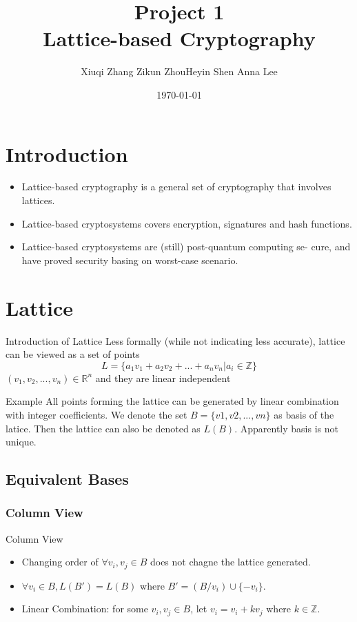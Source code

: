 \documentclass{beamer}
\author{Xiuqi Zhang \quad Zikun Zhou\quad Heyin Shen \quad Anna Lee}
\title{Project 1 \\Lattice-based Cryptography}
\institute{JI SJTU}
\date{\today}
\begin{document}
	\begin{frame}
		\titlepage
	\end{frame}

	\begin{frame}
		\tableofcontents
	\end{frame}

	\section{Introduction}
	\begin{frame}
		\begin{itemize}
			\item Lattice-based cryptography is a general set of cryptography that involves lattices.
			\item Lattice-based cryptosystems covers encryption, signatures and hash functions.
			\item Lattice-based cryptosystems are (still) post-quantum computing se- cure, and have proved security basing on worst-case scenario.
		\end{itemize}
	\end{frame}
	
	\section{Lattice}
	\begin{frame}{Introduction of Lattice}
		Less formally (while not indicating less accurate), lattice can be viewed as a set of points
		\begin{equation}
			L=\{a_1v_1+a_2v_2+...+a_nv_n|a_i\in\mathbb{Z}\}
		\end{equation}
		$(v_1,v_2,...,v_n)\in\mathbb{R}^n$ and they are linear independent
		
	\end{frame}
	\begin{frame}{Example}
		All points forming the lattice can be generated by linear combination with integer coefficients. We denote the set $B = \{v1,v2,...,vn\}$ as basis of the latice. Then the lattice can also be denoted as $L(B)$. Apparently basis is not unique.
	\end{frame}
	\subsection{Equivalent Bases}
	\subsubsection{Column View}
	\begin{frame}{Column View}
		\begin{itemize}
			\item Changing order of $\forall v_i,v_j\in B$ does not chagne the lattice generated.
			\item $\forall v_i\in B, L(B')=L(B)$ where $B'=(B/v_i)\cup \{-v_i\}$.
			\item Linear Combination: for some $v_i, v_j\in B$, let $v_i=v_i+kv_j$ where $k\in \mathbb{Z}$.
		\end{itemize}
	\end{frame}
	
\end{document}
